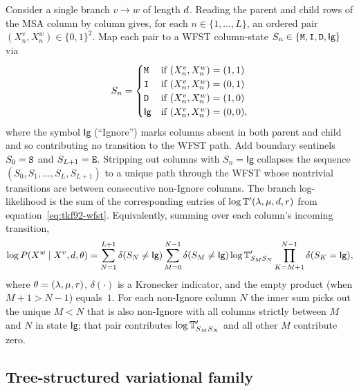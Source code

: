 Consider a single branch $v \to w$ of length $d$.
Reading the parent and child rows of the MSA column by column gives,
for each $n \in \{1, \ldots, L\}$, an ordered pair
$(X^v_n, X^w_n) \in \{0,1\}^2$.
Map each pair to a WFST column-state
$S_n \in \{{\tt M}, {\tt I}, {\tt D}, \mathsf{Ig}\}$ via
\begin{equation}
\label{eq:state-map}
S_n =
\begin{cases}
  {\tt M} & \text{if } (X^v_n, X^w_n) = (1,1) \\
  {\tt I} & \text{if } (X^v_n, X^w_n) = (0,1) \\
  {\tt D} & \text{if } (X^v_n, X^w_n) = (1,0) \\
  \mathsf{Ig} & \text{if } (X^v_n, X^w_n) = (0,0),
\end{cases}
\end{equation}
where the symbol $\mathsf{Ig}$ (``Ignore'') marks columns absent in
both parent and child and so contributing no transition to the WFST
path.
Add boundary sentinels $S_0 = {\tt S}$ and $S_{L+1} = {\tt E}$.
Stripping out columns with $S_n = \mathsf{Ig}$ collapses the sequence
$(S_0, S_1, \ldots, S_L, S_{L+1})$
to a unique path through the WFST whose nontrivial transitions are
between consecutive non-Ignore columns.
The branch log-likelihood is the sum of the corresponding entries of
$\log \mathbb{T}'(\lambda, \mu, d, r)$ from
equation~\eqref{eq:tkf92-wfst}.
Equivalently, summing over each column's incoming transition,
\begin{equation}
\label{eq:branch-LL}
\log P(X^w \mid X^v, d, \theta)
= \sum_{N=1}^{L+1}
   \delta(S_N \neq \mathsf{Ig})
   \sum_{M=0}^{N-1}
     \delta(S_M \neq \mathsf{Ig})
     \log \mathbb{T}'_{S_M S_N}
     \prod_{K=M+1}^{N-1} \delta(S_K = \mathsf{Ig}),
\end{equation}
where $\theta = (\lambda, \mu, r)$,
$\delta(\cdot)$ is a Kronecker indicator,
and the empty product (when $M+1 > N-1$) equals~$1$.
For each non-Ignore column $N$ the inner sum picks out the unique
$M < N$ that is also non-Ignore with all columns strictly between
$M$ and $N$ in state $\mathsf{Ig}$;
that pair contributes $\log \mathbb{T}'_{S_M S_N}$ and all other
$M$ contribute zero.

\subsection{Tree-structured variational family}
\label{sec:varanc-presence-q}

